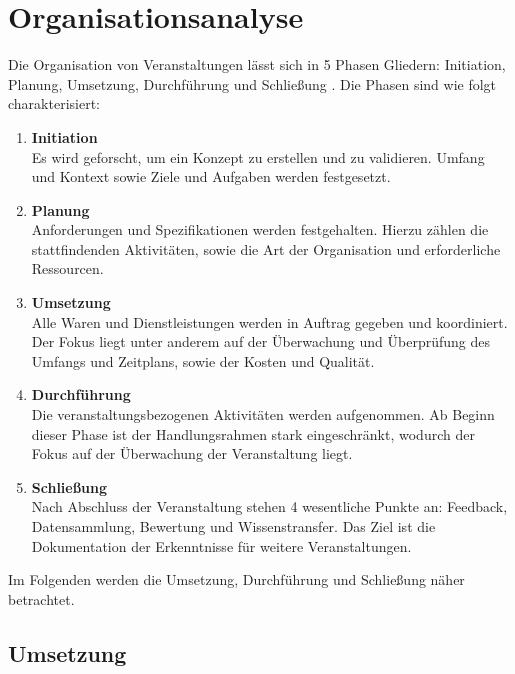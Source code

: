 \section{Organisationsanalyse} \label{sec:analysis-org}


Die Organisation von Veranstaltungen lässt sich in 5 Phasen Gliedern:
Initiation, Planung, Umsetzung, Durchführung und Schließung \cite{Silvers2013}.
Die Phasen sind wie folgt charakterisiert:

\begin{enumerate}
    \setlength{\itemsep}{1em}
    \item \textbf{Initiation} \\
          Es wird geforscht, um ein Konzept zu erstellen und zu validieren.
          Umfang und Kontext sowie Ziele und Aufgaben werden festgesetzt.
    \item \textbf{Planung} \\
          Anforderungen und Spezifikationen werden festgehalten. Hierzu zählen
          die stattfindenden Aktivitäten, sowie die Art der Organisation und
          erforderliche Ressourcen.
    \item \textbf{Umsetzung} \\
          Alle Waren und Dienstleistungen werden in Auftrag gegeben und
          koordiniert. Der Fokus liegt unter anderem auf der Überwachung und
          Überprüfung des Umfangs und Zeitplans, sowie der Kosten und Qualität.
    \item \textbf{Durchführung} \\
          Die veranstaltungsbezogenen Aktivitäten werden aufgenommen. Ab Beginn
          dieser Phase ist der Handlungsrahmen stark eingeschränkt, wodurch der
          Fokus auf der Überwachung der Veranstaltung liegt.
    \item \textbf{Schließung} \\
          Nach Abschluss der Veranstaltung stehen 4 wesentliche Punkte an:
          Feedback, Datensammlung, Bewertung und Wissenstransfer. Das Ziel ist
          die Dokumentation der Erkenntnisse für weitere Veranstaltungen.
\end{enumerate}

Im Folgenden werden die Umsetzung, Durchführung und Schließung näher betrachtet.

\subsection{Umsetzung} \label{sec:analysis-org-umsetzung}

